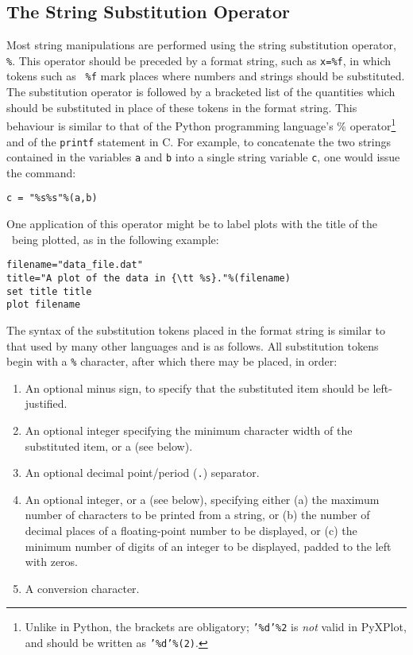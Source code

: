 \subsection{The String Substitution Operator}
\label{sec:stringsubop}

Most string manipulations are performed using the string substitution operator,
{\tt \%}. This operator should be
preceded by a format string, such as {\tt x=\%f}, in which tokens such as {\tt
\%f} mark places where numbers and strings should be substituted. The
substitution operator is followed by a bracketed list of the quantities which
should be substituted in place of these tokens in the format string. This
behaviour is similar to that of the Python programming language's \%
operator\footnote{Unlike in Python, the brackets are obligatory; {\tt '\%d'\%2}
is {\it not} valid in PyXPlot, and should be written as {\tt '\%d'\%(2)}.} and
of the {\tt printf} statement in C.  For example, to concatenate the two
strings contained in the variables {\tt a} and {\tt b} into a single string
variable {\tt c}, one would issue the command:
\begin{verbatim}
c = "%s%s"%(a,b)
\end{verbatim}

One application of this operator might be to label plots with the title of the
\datafile\ being plotted, as in the following example:
\begin{verbatim}
filename="data_file.dat"
title="A plot of the data in {\tt %s}."%(filename)
set title title
plot filename
\end{verbatim}

The syntax of the substitution tokens placed in the format string is similar to
that used by many other languages and is as follows. All substitution tokens
begin with a {\tt \%} character, after which there may be placed, in order:

\begin{enumerate}
\item An optional minus sign, to specify that the substituted item should be left-justified.
\item An optional integer specifying the minimum character width of the substituted item, or a {\tt *} (see below).
\item An optional decimal point/period ({\tt .}) separator.
\item An optional integer, or a {\tt *} (see below), specifying either (a) the maximum number of characters to be printed from a string, or (b) the number of decimal places of a floating-point number to be displayed, or (c) the minimum number of digits of an integer to be displayed, padded to the left with zeros.
\item A conversion character.
\end{enumerate}

